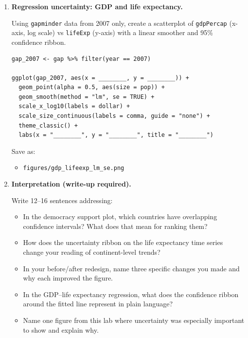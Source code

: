 \documentclass[11pt]{article}
\begin{document}
\begin{enumerate}
Save as:
\begin{itemize}
  \item \texttt{figures/redesign\_before.png}
  \item \texttt{figures/redesign\_after.png}
\end{itemize}

\item \textbf{Regression uncertainty: GDP and life expectancy.}

Using \texttt{gapminder} data from 2007 only, create a scatterplot of \texttt{gdpPercap} (x-axis, log scale) vs \texttt{lifeExp} (y-axis) with a linear smoother and 95\% confidence ribbon.

\begin{verbatim}
gap_2007 <- gap %>% filter(year == 2007)

ggplot(gap_2007, aes(x = ________, y = ________)) +
  geom_point(alpha = 0.5, aes(size = pop)) +
  geom_smooth(method = "lm", se = TRUE) +
  scale_x_log10(labels = dollar) +
  scale_size_continuous(labels = comma, guide = "none") +
  theme_classic() +
  labs(x = "________", y = "________", title = "________")
\end{verbatim}

Save as:
\begin{itemize}
  \item \texttt{figures/gdp\_lifeexp\_lm\_se.png}
\end{itemize}

\item \textbf{Interpretation (write-up required).}

Write 12--16 sentences addressing:
\begin{itemize}
  \item In the democracy support plot, which countries have overlapping confidence intervals? What does that mean for ranking them?
  \item How does the uncertainty ribbon on the life expectancy time series change your reading of continent-level trends?
  \item In your before/after redesign, name three specific changes you made and why each improved the figure.
  \item In the GDP--life expectancy regression, what does the confidence ribbon around the fitted line represent in plain language?
  \item Name one figure from this lab where uncertainty was especially important to show and explain why.
\end{itemize}


\end{enumerate}
\end{document}
